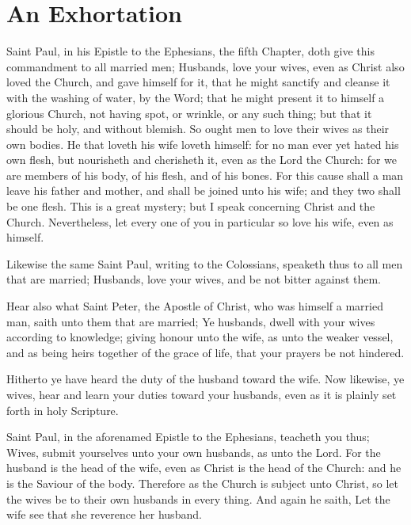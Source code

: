 \section{An Exhortation}


Saint Paul, in his Epistle to the Ephesians, the fifth Chapter, doth give this commandment to all married men; Husbands, love your wives, even as Christ also loved the Church, and gave himself for it, that he might sanctify and cleanse it with the washing of water, by the Word; that he might present it to himself a glorious Church, not having spot, or wrinkle, or any such thing; but that it should be holy, and without blemish. So ought men to love their wives as their own bodies. He that loveth his wife loveth himself: for no man ever yet hated his own flesh, but nourisheth and cherisheth it, even as the Lord the Church: for we are members of his body, of his flesh, and of his bones. For this cause shall a man leave his father and mother, and shall be joined unto his wife; and they two shall be one flesh. This is a great mystery; but I speak concerning Christ and the Church. Nevertheless, let every one of you in particular so love his wife, even as himself.


Likewise the same Saint Paul, writing to the Colossians, speaketh thus to all men that are married; Husbands, love your wives, and be not bitter against them.

Hear also what Saint Peter, the Apostle of Christ, who was himself a married man, saith unto them that are married; Ye husbands, dwell with your wives according to knowledge; giving honour unto the wife, as unto the weaker vessel, and as being heirs together of the grace of life, that your prayers be not hindered.

Hitherto ye have heard the duty of the husband toward the wife. Now likewise, ye wives, hear and learn your duties toward your husbands, even as it is plainly set forth in holy Scripture.

Saint Paul, in the aforenamed Epistle to the Ephesians, teacheth you thus; Wives, submit yourselves unto your own husbands, as unto the Lord. For the husband is the head of the wife, even as Christ is the head of the Church: and he is the Saviour of the body. Therefore as the Church is subject unto Christ, so let the wives be to their own husbands in every thing. And again he saith, Let the wife see that she reverence her husband.

